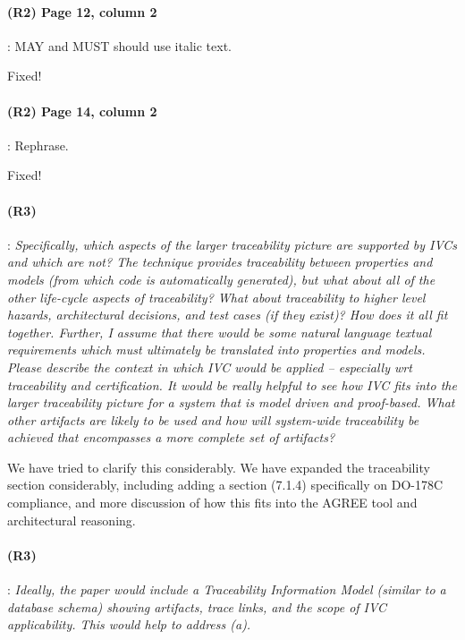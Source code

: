 \documentclass{article}
\begin{document}
\paragraph{(R2) Page 12, column 2} : MAY and MUST should use italic text.
\vspace{0.05in}

Fixed!

\paragraph{(R2) Page 14, column 2} : Rephrase.
\vspace{0.05in}

Fixed!

\paragraph{(R3)} :
\textit{Specifically, which aspects of the larger traceability picture are supported by IVCs and which are not? The technique provides traceability between properties and models (from which code is automatically generated), but what about all of the other life-cycle aspects of traceability? What about traceability to higher level hazards, architectural decisions, and test cases (if they exist)? How does it all fit together. Further, I assume that there would be some natural language textual requirements which must ultimately be translated into properties and models.       Please describe the context in which IVC would be applied -- especially wrt traceability and certification. It would be really helpful to see how IVC fits into the larger traceability picture for a system that is model driven and proof-based. What other artifacts are likely to be used and how will system-wide traceability be achieved that encompasses a more complete set of artifacts?}
\vspace{0.05in}

We have tried to clarify this considerably.  We have expanded the traceability section considerably, including adding a section (7.1.4) specifically on DO-178C compliance, and more discussion of how this fits into the AGREE tool and architectural reasoning.

\paragraph{(R3)}:
\textit{Ideally, the paper would include a Traceability Information Model (similar to a database schema) showing artifacts, trace links, and the scope of IVC applicability. This would help to address (a).}
\vspace{0.05in}
\end{document}
